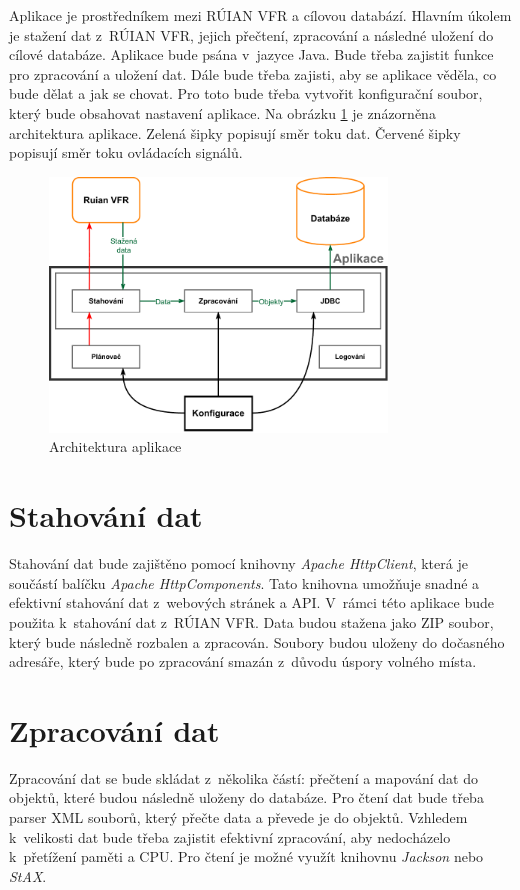Aplikace je prostředníkem mezi RÚIAN VFR a cílovou databází.
Hlavním úkolem je stažení dat z~RÚIAN VFR, jejich přečtení, zpracování a následné uložení do cílové databáze.
Aplikace bude psána v~jazyce Java. Bude třeba zajistit funkce pro zpracování a uložení dat.
Dále bude třeba zajisti, aby se aplikace věděla, co bude dělat a jak se chovat.
Pro toto bude třeba vytvořit konfigurační soubor, který bude obsahovat nastavení aplikace.
Na obrázku \ref{fig:architektura} je znázorněna architektura aplikace.
Zelená šipky popisují směr toku dat.
Červené šipky popisují směr toku ovládacích signálů.

\begin{figure}[!h]
    \centering
    \includegraphics[width=0.8\textwidth]{figures/Aplikace_Scheme.pdf}
    \caption{Architektura aplikace}
    \label{fig:architektura}
\end{figure}

\newpage

\section{Stahování dat}
Stahování dat bude zajištěno pomocí knihovny \textit{Apache HttpClient}, která je 
součástí balíčku \textit{Apache HttpComponents}. 
Tato knihovna umožňuje snadné a efektivní stahování dat z~webových stránek a API. 
V~rámci této aplikace bude použita k~stahování dat z~RÚIAN VFR.
Data budou stažena jako ZIP soubor, který bude následně rozbalen a zpracován.
Soubory budou uloženy do dočasného adresáře, který bude po zpracování smazán z~důvodu úspory volného místa.

\section{Zpracování dat}
Zpracování dat se bude skládat z~několika částí:
přečtení a mapování dat do objektů, které budou následně uloženy do databáze.
Pro čtení dat bude třeba parser XML souborů, který přečte data a převede je do objektů.
Vzhledem k~velikosti dat bude třeba zajistit efektivní zpracování, aby nedocházelo 
k~přetížení paměti a CPU.
Pro čtení je možné využít knihovnu \textit{Jackson} nebo \textit{StAX}.

